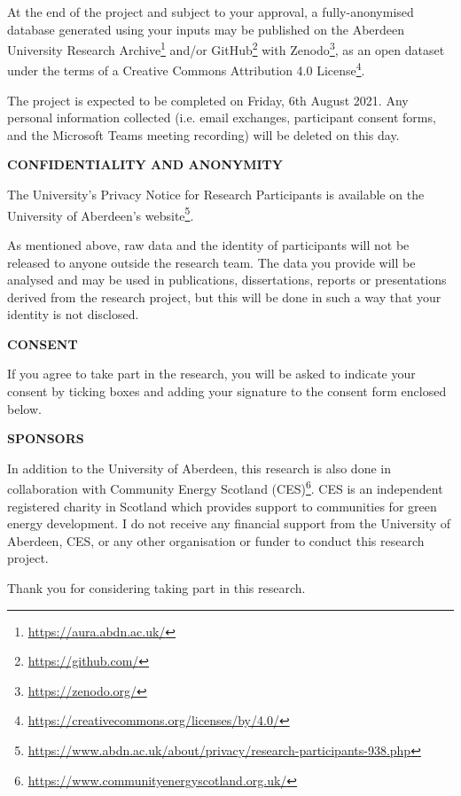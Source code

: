 {At the end of the project and subject to your approval, a fully-anonymised database generated using your inputs may be published on the Aberdeen University Research Archive\footnote{\url{https://aura.abdn.ac.uk/}} and/or GitHub\footnote{\url{https://github.com/}} with Zenodo\footnote{\url{https://zenodo.org/}}, as an open dataset under the terms of a Creative Commons Attribution 4.0 License\footnote{\url{https://creativecommons.org/licenses/by/4.0/}}.

The project is expected to be completed on Friday, 6th August 2021. Any personal information collected (i.e. email exchanges, participant consent forms, and the Microsoft Teams meeting recording) will be deleted on this day.

\vspace{20pt}
\textbf{\MakeUppercase{Confidentiality and anonymity}}

The University's Privacy Notice for Research Participants is available on the University of Aberdeen's website\footnote{\url{https://www.abdn.ac.uk/about/privacy/research-participants-938.php}}.

As mentioned above, raw data and the identity of participants will not be released to anyone outside the research team. The data you provide will be analysed and may be used in publications, dissertations, reports or presentations derived from the research project, but this will be done in such a way that your identity is not disclosed.

\vspace{20pt}
\textbf{\MakeUppercase{Consent}}

If you agree to take part in the research, you will be asked to indicate your
consent by ticking boxes and adding your signature to the consent form
enclosed below.

\vspace{20pt}
\textbf{\MakeUppercase{Sponsors}}

In addition to the University of Aberdeen, this research is also done in collaboration with Community Energy Scotland (CES)\footnote{\url{https://www.communityenergyscotland.org.uk/}}. CES is an independent registered charity in Scotland which provides support to communities for green energy development. I do not receive any financial support from the University of Aberdeen, CES, or any other organisation or funder to conduct this research project.

\vspace{30pt}
Thank you for considering taking part in this research.

}
